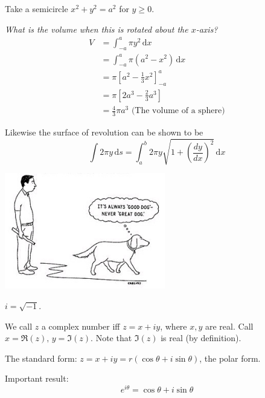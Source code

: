 \documentclass[10pt]{scrartcl}
\begin{document}
\begin{example}
Take a semicircle $x^2 + y^2 = a^2$ for $y \geq 0$. 

\emph{What is the volume when this is rotated about the $x$-axis?}
\begin{align*}
  V &= \int_{-a}^a\pi y^2\,\mathrm{d}x\\
  &= \int_{-a}^a \pi(a^2 - x^2)\,\mathrm{d}x\\
  &= \pi\left[a^2 - \frac{1}{3}x^2\right]_{-a}^a\\
  &= \pi\left[2a^3 - \frac{2}{3}a^3\right]\\
  &= \frac{4}{3}\pi a^3 \text{ (The volume of a sphere)}
\end{align*}
\end{example}

Likewise the surface of revolution can be shown to be 
\[
  \int 2\pi y\,\mathrm{d}s = \int_a^b 2\pi y \sqrt{1 + \left(\frac{dy}{dx}\right)^2}\,\mathrm{d}x
\]

\vspace*{1.5cm}

\begin{center}
\includegraphics[width = 7cm]{cartoon1.jpg}	
\end{center}








\begin{definition}
$i= \sqrt{-1}$.
\end{definition}

We call $z$ a complex number iff $z = x+iy$, where $x,y$ are real. Call $x = \Re(z),\, y = \Im(z)$. Note that $\Im(z)$ is real (by definition). 

The standard form: $z = x+iy = r(\cos\theta + i\sin\theta)$, the polar form.

Important result: 
\[e^{i\theta} = \cos\theta + i\sin\theta\]
\end{document}
